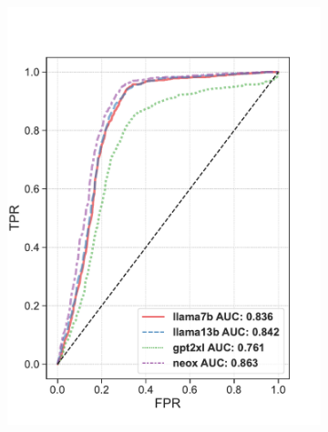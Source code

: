 \documentclass[letterpaper]{article} %
\begin{document}
\begin{figure}[ht]
\centering
\hspace*{0mm}
\begin{subfigure}[b]{0.48\linewidth}
\centering
\includegraphics[width=\linewidth,trim={0cm 0.8cm 1cm 1cm},clip]{pictures/AI_AUCtrain.pdf}
\label{ai_auc_train}
\end{subfigure}
\hspace{0.3mm}
\begin{subfigure}[b]{0.48\linewidth}
\centering

\end{subfigure}
\end{figure}
\end{document}
